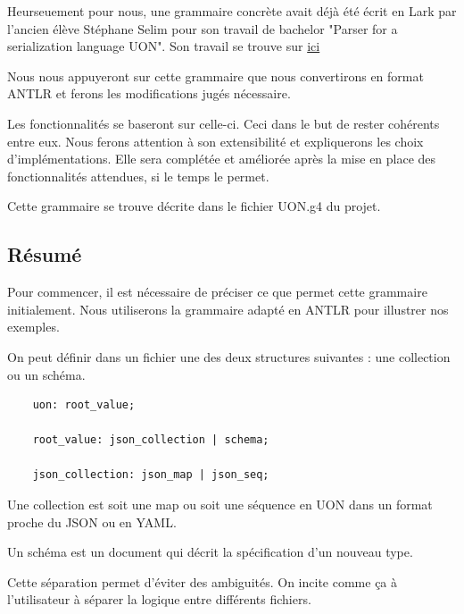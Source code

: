 \documentclass[
    iict, %
    il, %
]{heig-tb}
\begin{document}
Heurseuement pour nous, une grammaire concrète avait déjà été écrit en Lark par l'ancien élève Stéphane Selim pour son travail de bachelor "Parser for a serialization language UON".
Son travail se trouve sur \href{https://github.com/uon-language/uon-parser}{ici}

Nous nous appuyeront sur cette grammaire que nous convertirons en format ANTLR et ferons les modifications jugés nécessaire.

Les fonctionnalités se baseront sur celle-ci. Ceci dans le but de rester cohérents entre eux.
Nous ferons attention à son extensibilité et expliquerons les choix d'implémentations.
Elle sera complétée et améliorée après la mise en place des fonctionnalités attendues, si le temps le permet.

Cette grammaire se trouve décrite dans le fichier UON.g4 du projet.

\subsection{Résumé}
Pour commencer, il est nécessaire de préciser ce que permet cette grammaire initialement.
Nous utiliserons la grammaire adapté en ANTLR pour illustrer nos exemples.

On peut définir dans un fichier une des deux structures suivantes : une collection ou un schéma.

\begin{lstlisting}
    uon: root_value;

    root_value: json_collection | schema;

    json_collection: json_map | json_seq;
\end{lstlisting}

Une collection est soit une map ou soit une séquence en UON dans un format proche du JSON ou en YAML.




Un schéma est un document qui décrit la spécification d'un nouveau type.



Cette séparation permet d'éviter des ambiguités. On incite comme ça à l'utilisateur à séparer la logique entre différents fichiers.
\end{document}
